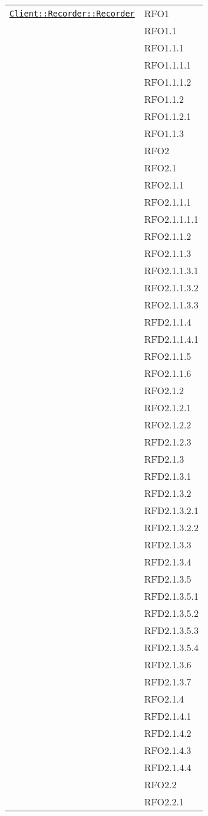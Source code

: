 \begin{longtable}{|>{\centering}m{10cm}|m{3cm}<{\centering}|}
\hyperref[Client::Recorder::Recorder]{\texttt{Client::Recorder::Recorder}} & RFO1\\
& RFO1.1\\
& RFO1.1.1\\
& RFO1.1.1.1\\
& RFO1.1.1.2\\
& RFO1.1.2\\
& RFO1.1.2.1\\
& RFO1.1.3\\
& RFO2\\
& RFO2.1\\
& RFO2.1.1\\
& RFO2.1.1.1\\
& RFO2.1.1.1.1\\
& RFO2.1.1.2\\
& RFO2.1.1.3\\
& RFO2.1.1.3.1\\
& RFO2.1.1.3.2\\
& RFO2.1.1.3.3\\
& RFD2.1.1.4\\
& RFD2.1.1.4.1\\
& RFO2.1.1.5\\
& RFO2.1.1.6\\
& RFO2.1.2\\
& RFO2.1.2.1\\
& RFO2.1.2.2\\
& RFD2.1.2.3\\
& RFD2.1.3\\
& RFD2.1.3.1\\
& RFD2.1.3.2\\
& RFD2.1.3.2.1\\
& RFD2.1.3.2.2\\
& RFD2.1.3.3\\
& RFD2.1.3.4\\
& RFD2.1.3.5\\
& RFD2.1.3.5.1\\
& RFD2.1.3.5.2\\
& RFD2.1.3.5.3\\
& RFD2.1.3.5.4\\
& RFD2.1.3.6\\
& RFD2.1.3.7\\
& RFO2.1.4\\
& RFD2.1.4.1\\
& RFD2.1.4.2\\
& RFO2.1.4.3\\
& RFD2.1.4.4\\
& RFO2.2\\
& RFO2.2.1\\

\end{longtable}
